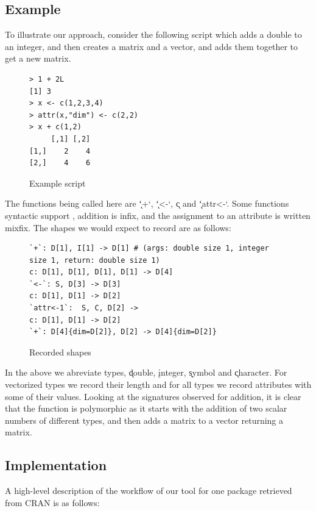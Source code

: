 \documentclass[acmsmall,10pt,review,anonymous]{acmart}\settopmatter{printfolios=true,printccs=false,printacmref=false}
\begin{document}
\subsection{Example}

To illustrate our approach, consider the following script which adds a double
to an integer, and then creates a matrix and a vector, and adds them together to
get a new matrix.

\begin{figure}[!hb]{\small\begin{lstlisting}[style=R]
> 1 + 2L
[1] 3
> x <- c(1,2,3,4)
> attr(x,"dim") <- c(2,2)
> x + c(1,2)
     [,1] [,2]
[1,]    2    4
[2,]    4    6
\end{lstlisting}}\caption{Example script}\label{example}\end{figure}

The functions being called here are \k{`+`}, \k{`<-`}, \k{c} and
\k{`attr<-`}.  Some functions syntactic support , addition is infix, and the
assignment to an attribute is written mixfix. The shapes we would expect to
record are as follows:

\begin{figure}[!hb]{\small\begin{lstlisting}[style=R]
`+`: D[1], I[1] -> D[1] # (args: double size 1, integer size 1, return: double size 1)
c: D[1], D[1], D[1], D[1] -> D[4]
`<-`: S, D[3] -> D[3]
c: D[1], D[1] -> D[2]
`attr<-1`:  S, C, D[2] -> 
c: D[1], D[1] -> D[2]
`+`: D[4]{dim=D[2]}, D[2] -> D[4]{dim=D[2]}
\end{lstlisting}}\caption{Recorded shapes}\label{shapes}\end{figure}

In the above we abreviate types, \k{double}, \k{integer}, \k{symbol} and
\k{character}. For vectorized types we record their length and for all types
we record attributes with some of their values. Looking at the signatures
observed for addition, it is clear that the function is polymorphic as it
starts with the addition of two scalar numbers of different types, and then
adds a matrix to a vector returning a matrix.

\subsection{Implementation}

A high-level description of the workflow of our tool for one package
retrieved from CRAN is as follows:
\end{document}
